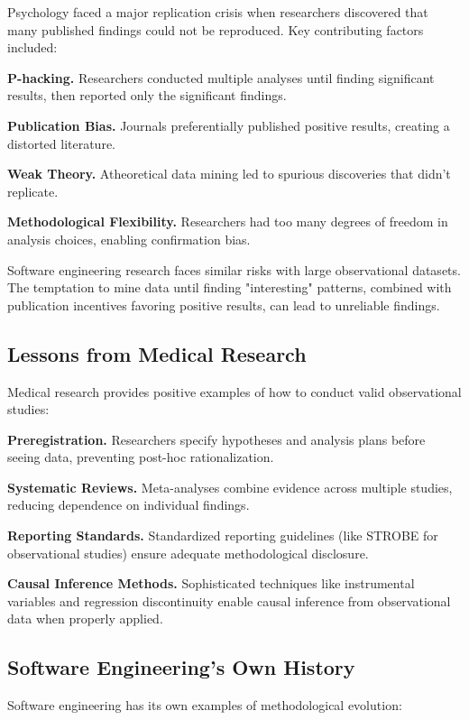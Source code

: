 \documentclass[conference]{IEEEtran}
\begin{document}
Psychology faced a major replication crisis when researchers discovered that many published findings could not be reproduced. Key contributing factors included:

\textbf{P-hacking.} Researchers conducted multiple analyses until finding significant results, then reported only the significant findings.

\textbf{Publication Bias.} Journals preferentially published positive results, creating a distorted literature.

\textbf{Weak Theory.} Atheoretical data mining led to spurious discoveries that didn't replicate.

\textbf{Methodological Flexibility.} Researchers had too many degrees of freedom in analysis choices, enabling confirmation bias.

Software engineering research faces similar risks with large observational datasets. The temptation to mine data until finding "interesting" patterns, combined with publication incentives favoring positive results, can lead to unreliable findings.

\subsection{Lessons from Medical Research}

Medical research provides positive examples of how to conduct valid observational studies:

\textbf{Preregistration.} Researchers specify hypotheses and analysis plans before seeing data, preventing post-hoc rationalization.

\textbf{Systematic Reviews.} Meta-analyses combine evidence across multiple studies, reducing dependence on individual findings.

\textbf{Reporting Standards.} Standardized reporting guidelines (like STROBE for observational studies) ensure adequate methodological disclosure.

\textbf{Causal Inference Methods.} Sophisticated techniques like instrumental variables and regression discontinuity enable causal inference from observational data when properly applied.

\subsection{Software Engineering's Own History}

Software engineering has its own examples of methodological evolution:
\end{document}
